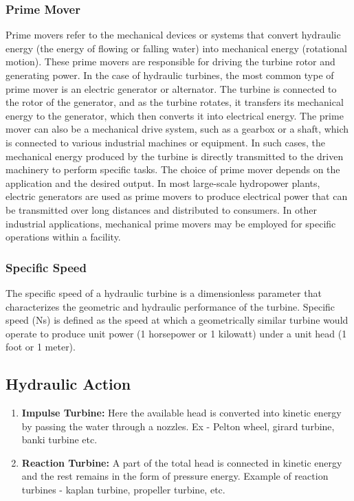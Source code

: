 \documentclass{article}
\begin{document}
\subsubsection*{Prime Mover}
Prime movers refer to the mechanical devices or systems that convert hydraulic energy (the energy of flowing or falling water) into mechanical energy (rotational motion). These prime movers are responsible for driving the turbine rotor and generating power. In the case of hydraulic turbines, the most common type of prime mover is an electric generator or alternator. The turbine is connected to the rotor of the generator, and as the turbine rotates, it transfers its mechanical energy to the generator, which then converts it into electrical energy. The prime mover can also be a mechanical drive system, such as a gearbox or a shaft, which is connected to various industrial machines or equipment. In such cases, the mechanical energy produced by the turbine is directly transmitted to the driven machinery to perform specific tasks. The choice of prime mover depends on the application and the desired output. In most large-scale hydropower plants, electric generators are used as prime movers to produce electrical power that can be transmitted over long distances and distributed to consumers. In other industrial applications, mechanical prime movers may be employed for specific operations within a facility.

\subsubsection*{Specific Speed}
The specific speed of a hydraulic turbine is a dimensionless parameter that characterizes the geometric and hydraulic performance of the turbine. Specific speed (Ns) is defined as the speed at which a geometrically similar turbine would operate to produce unit power (1 horsepower or 1 kilowatt) under a unit head (1 foot or 1 meter).

\subsection*{Hydraulic Action}
\begin{enumerate}
  \item \textbf{Impulse Turbine:} Here the available head is converted into kinetic energy by passing the water through a nozzles. Ex - Pelton wheel, girard turbine, banki turbine etc. 
  \item \textbf{Reaction Turbine:} A part of the total head is connected in kinetic energy and the rest remains in the form of pressure energy. Example of reaction turbines - kaplan turbine, propeller turbine, etc. 

\end{enumerate}
\end{document}
